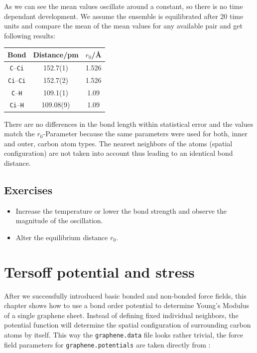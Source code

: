 As we can see the mean values oscillate around a constant, so there is
no time dependant development. We assume the ensemble is equilibrated
after 20 time units and compare the mean of the mean values for any
available pair and get following results:

\begin{center}
    \begin{tabular}{ccc}
        \toprule
        Bond & Distance/\si{\pico\meter} & $r_0$/\si{\angstrom} \\
        \midrule
        \texttt{C}--\texttt{Ci} & 152.7(1) & 1.526 \\
        \texttt{Ci}--\texttt{Ci} & 152.7(2) & 1.526 \\
        \texttt{C}--\texttt{H} & 109.1(1) & 1.09 \\
        \texttt{Ci}--\texttt{H} & 109.08(9) & 1.09 \\
        \bottomrule
    \end{tabular}
\end{center}

There are no differences in the bond length within statistical error and
the values match the $r_0$-Parameter because the same parameters were
used for both, inner and outer, carbon atom types. The nearest neighbors
of the atoms (spatial configuration) are not taken into account thus
leading to an identical bond distance.

\subsection{Exercises}
\begin{itemize}
    \item Increase the temperature or lower the bond strength and
        observe the magnitude of the oscillation.
    \item Alter the equilibrium distance $r_0$.
\end{itemize}

\section{Tersoff potential and stress}
After we successfully introduced basic bonded and non-bonded force fields, this
chapter shows how to use a bond order potential to determine Young's Modulus of
a single graphene sheet. Instead of defining fixed individual neighbors, the
potential function will determine the spatial configuration of surrounding
carbon atoms by itself. This way the \texttt{graphene.data} file looks rather trivial,
the force field parameters for \texttt{graphene.potentials} are taken directly
from \cite{tersoff88a}:

